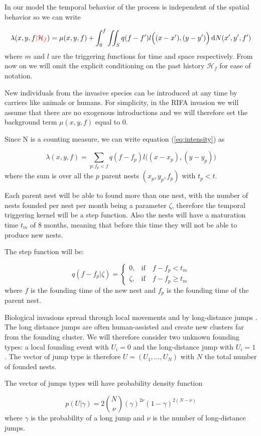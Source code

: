 \documentclass[11pt,a4paper]{article}
\renewcommand{\d}[1]{\ensuremath{\operatorname{d}\!{#1}}}
\begin{document}
In our model the temporal behavior of the process is independent of the spatial behavior so we can write

\begin{equation*}
    \lambda(x, y, f {\color{red}| \mathcal{H}_f}) = \mu(x, y, f) + \int_{0}^{f} \iint_{S} q(f-f') l\Big((x - x'), (y - y')\Big) \d N(x', y', f')
\end{equation*}
where $m$ and $l$ are the triggering functions for time and space respectively. {\color{red} From now on we will omit the explicit conditioning on the past history $\mathcal{H}_f$ for ease of notation.}

New individuals from the invasive species can be introduced at any time by carriers like animals or humans. For simplicity, in the RIFA invasion we will assume that there are no exogenous introductions and we will therefore set the background term $\mu(x, y, f) $ equal to 0.

{\color{red} Since N is a counting measure, we can write equation (\ref{eq:intensity}) as

\begin{equation*}
    \lambda(x, y, f) = \sum_{ p: f_p < f } q(f - f_p) l \Big((x - x_p),(y - y_p) \Big)
\end{equation*}
where the sum is over all the $p$ parent nests $(x_p, y_p, f_p)$ with $t_p < t$.}

Each parent nest will be able to found more than one nest, with the number of nests founded per nest per month being a parameter $\zeta$, therefore the temporal triggering kernel will be a step function. Also the nests will have a maturation time $t_m$ of 8 months, meaning that before this time they will not be able to produce new nests. 

The step function will be:

\begin{equation*}
    q (f - f_p | \zeta) =
    \begin{cases}
        0, & \mbox{if} \quad f - f_p < t_{m} \\
        \zeta, & \mbox{if} \quad f - f_p \geq t_{m}
    \end{cases}
\end{equation*}
where $f$ is the founding time of the new nest and $f_p$ is the founding time of the parent nest.

{\color{red} Biological invasions spread through local movements and by long-distance jumps \cite{Suarez}. The long distance jumps are often human-assisted and create new clusters far from the founding cluster. We will therefore consider two unknown founding types: a local founding event with $U_i = 0$ and the long-distance jump with $U_i = 1$. The vector of jump type is therefore $U = (U_1, \dots, U_N)$ with $N$ the total number of founded nests.

The vector of jumps types will have probability density function

\begin{equation*}
    p(U| \gamma ) = 2{N \choose \nu}(\gamma)^{2\nu}(1 - \gamma)^{2(N - \nu)}
\end{equation*}
where $\gamma$ is the probability of a long jump and $\nu$ is the number of long-distance jumps.}
\end{document}
